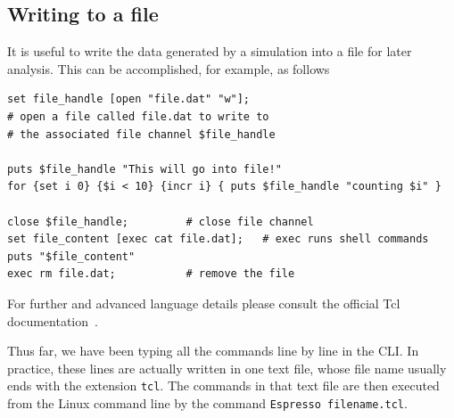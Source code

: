 \documentclass[
paper=a4,                       %
fontsize=11pt,                  %
twoside,                        %
footsepline,                    %
headsepline,                    %
headinclude=false,              %
footinclude=false,              %
pagesize,                       %
]{scrartcl}
\newtheorem{task}{Task}
\begin{document}
\subsection{Writing to a file}

It is useful to write the data generated by a simulation into a file for later analysis. This can be accomplished, for example, as follows

{\small\vspace{0,2cm}
\begin{lstlisting}[numbers=none]
set file_handle [open "file.dat" "w"];
# open a file called file.dat to write to 
# the associated file channel $file_handle
		
puts $file_handle "This will go into file!"
for {set i 0} {$i < 10} {incr i} { puts $file_handle "counting $i" }

close $file_handle;			# close file channel
set file_content [exec cat file.dat];   # exec runs shell commands
puts "$file_content"
exec rm file.dat;			# remove the file
\end{lstlisting}\vspace{0,2cm}
}

\noindent For further and advanced language details please consult the official Tcl documentation~\cite{tcl_url}.

Thus far, we have been typing all the commands line by line in the CLI. In practice, these lines are actually written in one text file, whose file name usually ends with the extension \texttt{tcl}. The commands in that text file are then executed from the Linux command line by the command \texttt{Espresso filename.tcl}.

\vspace{1cm}
\vspace{1cm}
  
\end{document}
